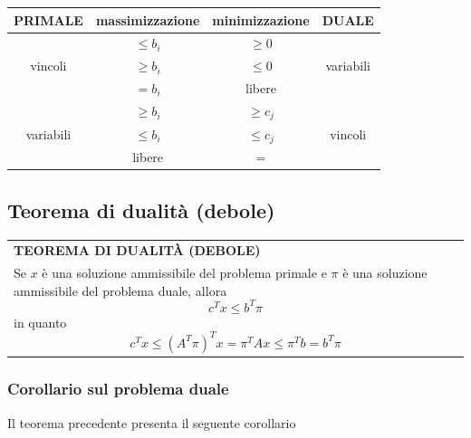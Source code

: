 \documentclass[a4paper]{extarticle}
\renewcommand\arraystretch{}
\begin{document}
\vspace{1em}
\noindent
\begin{table}[H]
    \setlength{\tabcolsep}{4pt}
    \renewcommand{\arraystretch}{1.2}
    \noindent
    \centering
    \begin{tabular}{|c|c||c|c|}
        PRIMALE & massimizzazione & minimizzazione & DUALE\\
        \hline
        \multirow{3}{4em}{vincoli} &$\leq b_i$&$\geq 0$& \multirow{3}{4em}{variabili}\\
                                   &$\geq b_i$&$\leq 0$&\\ 
                                   &$=b_i$&libere&\\
        \hline
        \multirow{3}{4em}{variabili} &$\geq b_i$&$\geq c_j$& \multirow{3}{4em}{vincoli}\\
                                   &$\leq b_i$&$\leq c_j$&\\ 
                                   &libere&=&\\
        \hline
    \end{tabular}
\end{table}

\vspace{1em}
\noindent
\subsection{Teorema di dualità (debole)}

\vspace{1em}
\setlength{\tabcolsep}{14pt}
\renewcommand{\arraystretch}{2}
\noindent
\begin{tabularx}{\textwidth}{@{}|P|@{}}
    \hline
    {\textbf{TEOREMA DI DUALITÀ (DEBOLE)}}\\
    \parbox{\linewidth}{Se $x$ è una soluzione ammissibile del problema primale e $\pi$ è una soluzione ammissibile del problema duale, allora
    \[c^T x \leq b^T \pi\]
    in quanto
    \[c^T x \leq (A^T \pi)^T x = \pi^T Ax \leq \pi^T b=b^T \pi\]
    \vspace{-1mm}}\\
    \hline
\end{tabularx}

\vspace{1em}
\noindent
\subsubsection{Corollario sul problema duale}
Il teorema precedente presenta il seguente corollario
\end{document}
